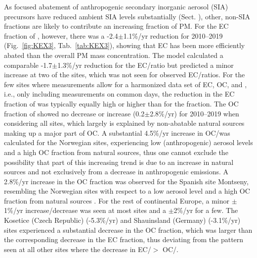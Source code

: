As focused abatement of anthropogenic secondary inorganic aerosol (SIA)
precursors have reduced ambient SIA levels substantially (Sect. ),
other, non-SIA fractions are likely to contribute an increasing fraction
of PM. For the EC fraction of \pmfine, however, there was a -2.4$\pm$1.1\%/yr
reduction for 2010--2019 (Fig.~\ref{fig:KEX3}, Tab.~\ref{tab:KEX3}), showing that EC has been
more efficiently abated than the overall PM mass concentration. The model
calculated a comparable -1.7$\pm$1.3\%/yr reduction for the EC/\pmfine ratio
but predicted a minor increase at two of the sites, which was not seen for
observed EC/\pmfine ratios. For the few sites where measurements allow for
a harmonized data set of EC, OC,  and \pmfine, i.e., only including
measurements on common days, the reduction in the EC fraction of \pmfine
was typically equally high or higher than for the  fraction. The
OC fraction of \pmfine showed no decrease or increase (0.2$\pm$2.8\%/yr)
for 2010--2019 when considering all sites, which largely is explained by
non-abatable natural sources making up a major part of OC. A substantial
4.5\%/yr increase in OC/\pmfine was calculated for the Norwegian sites,
experiencing low (anthropogenic) aerosol levels and a high OC fraction
from natural sources, thus one cannot exclude the possibility that part
of this increasing trend is due to an increase in natural sources and
not exclusively from a decrease in anthropogenic emissions. A 2.8\%/yr
increase in the OC fraction was observed for the Spanish site Montseny,
resembling the Norwegian sites with respect to a low aerosol level and
a high OC fraction from natural sources \citep{Kulmala2011}. For the
rest of continental Europe, a minor $\pm$1\%/yr increase/decrease
was seen at most sites and a $\pm$2\%/yr for a few. The Kosetice
(Czech Republic) (-5.3\%/yr) and Shauinsland (Germany) (-3.1\%/yr) sites
experienced a substantial decrease in the OC fraction, which was larger
than the corresponding decrease in the EC fraction, thus deviating from
the pattern seen at all other sites where the decrease in EC/\pmfine $>$
OC/\pmfine.

